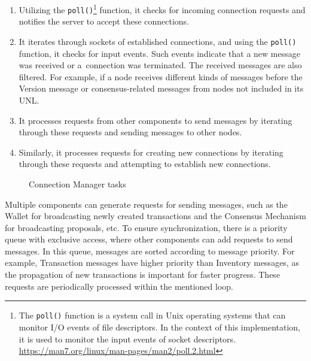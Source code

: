 \begin{enumerate}
    \item Utilizing the \texttt{poll()}\footnote{The \texttt{poll()} function is a system call in Unix operating systems that can monitor I/O events of file descriptors. In the context of this implementation, it is used to monitor the input events of socket descriptors. \url{https://man7.org/linux/man-pages/man2/poll.2.html}} function, it checks for incoming connection requests and notifies the server to accept these connections.
    \item It iterates through sockets of established connections, and using the \texttt{poll()} function, it checks for input events. Such events indicate that a new message was received or a~connection was terminated. The received messages are also filtered. For example, if a node receives different kinds of messages before the Version message or consensus-related messages from nodes not included in its UNL.
    \item It processes requests from other components to send messages by iterating through these requests and sending messages to other nodes.
    \item Similarly, it processes requests for creating new connections by iterating through these requests and attempting to establish new connections.
\end{enumerate}

\begin{figure}[h]
    \begin{center}
    \end{center}
    \caption{Connection Manager tasks}
    \label{figure:my.connection.manager}
\end{figure}

Multiple components can generate requests for sending messages, such as the Wallet for broadcasting newly created transactions and the Consensus Mechanism for broadcasting proposals, etc. To ensure synchronization, there is a priority queue with exclusive access, where other components can add requests to send messages. In this queue, messages are sorted according to message priority. For example, Transaction messages have higher priority than Inventory messages, as the propagation of new transactions is important for faster progress. These requests are periodically processed within the mentioned loop.

